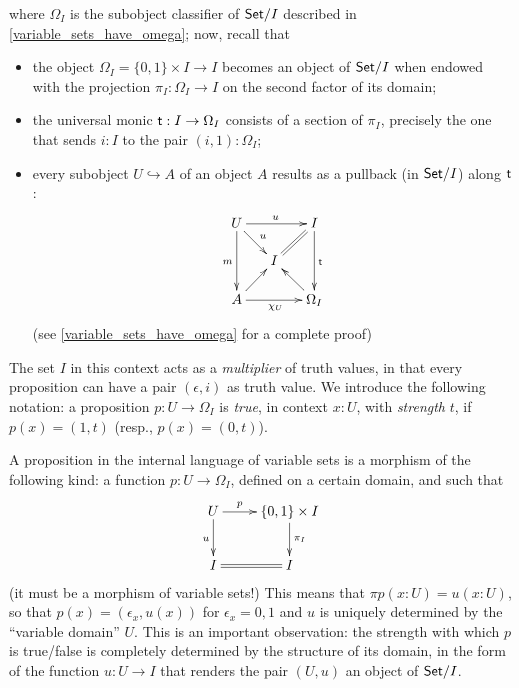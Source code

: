 where $\Omega_I$ is the subobject classifier of $\mathsf{Set}/I$ described in \autoref{variable_sets_have_omega}; now, recall that
\begin{itemize}
  \item the object $\Omega_I = \{0,1\}\times I \to I$ becomes an object of $\mathsf{Set}/I$ when endowed with the projection $\pi_I : \Omega_I \to I$ on the second factor of its domain;
  \item the universal monic $\textsf{t} : I \to \Omega_I$ consists of a section of $\pi_I$, precisely the one that sends $i : I$ to the pair $(i,1) : \Omega_I$;
  \item every subobject $U \hookrightarrow A$ of an object $A$ results as a pullback (in $\mathsf{Set}/I$) along $\textsf{t}$:
        \[\xymatrix@R=5mm@C=5mm{
          U\ar[dr]^u\ar[rr]^u\ar[dd]_m&& I\ar[dd]^{\tr} \ar@{=}[dl]\\
          &I& \\
          A \ar[ur]\ar[rr]_{\chi_U}&& \ar[ul]\Omega_I
          }\]
        (see \autoref{variable_sets_have_omega} for a complete proof)
\end{itemize}
The set $I$ in this context acts as a \emph{multiplier} of truth values, in that every proposition can have a pair $(\epsilon, i)$ as truth value. We introduce the following notation: a proposition $p : U \to \Omega_I$ is \emph{true}, in context $x :U$, with \emph{strength} $t$, if $p(x) =(1,t)$ (resp., $p(x)=(0,t)$).
\begin{remark}\label{very_importanta_force}
  A proposition in the internal language of variable sets is a morphism of the following kind: a function $p : U \to \Omega_I$, defined on a certain domain, and such that
  \[
    \xymatrix{
      U\ar[d]_u\ar[r]^-p  & \{0,1\}\times I \ar[d]^{\pi_I}\\
      I \ar@{=}[r]& I
    }
  \]
  (it must be a morphism of variable sets!) This means that $\pi p(x : U) = u(x : U)$, so that $p(x) = (\epsilon_x, u(x))$ for $\epsilon_x =0,1$ and $u$ is uniquely determined by the ``variable domain'' $U$. This is an important observation: the strength with which $p$ is true/false is completely determined by the structure of its domain, in the form of the function $u : U \to I$ that renders the pair $(U,u)$ an object of $\mathsf{Set}/I$.
\end{remark}
